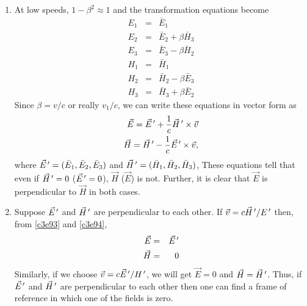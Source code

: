 \begin{enumerate}
\item At low speeds, $1 - \beta^2 \approx 1$ and the transformation equations
become
\begin{eqnarray}
E_1 &=& \bar{E}_1 \\ \label{c3e87}
E_2 &=& \bar{E}_2 + \beta\bar{H}_3 \\ \label{c3e88}
E_3 &=& \bar{E}_3 - \beta\bar{H}_2 \\ \label{c3e89}
H_1 &=& \bar{H}_1 \\ \label{c3e90}
H_2 &=& \bar{H}_2 - \beta\bar{E}_3 \\ \label{c3e92}
H_3 &=& \bar{H}_3 + \beta\bar{E}_2 \label{c3e93}
\end{eqnarray}
Since $\beta = v/c$ or really $v_1/c$, we can write these equations in vector form as
\begin{eqnarray}
\vec{E} = \vec{E}^{\,\prime} + \frac{1}{c}\vec{H}^{\,\prime} \times \vec{v} \label{c3e94} \\
\vec{H} = \vec{H}^{\,\prime} - \frac{1}{c}\vec{E}^{\,\prime} \times \vec{v}, \label{c3e95}
\end{eqnarray}
where $\vec{E}^{\,\prime} = (\bar{E}_1, \bar{E}_2, \bar{E}_3)$ and $\vec{H}^{\,\prime} = 
(\bar{H}_1, \bar{H}_2, \bar{H}_3)$, These equations tell that even if $\vec{H}^{\,\prime}
= 0$ ($\vec{E}^{\,\prime} = 0$), $\vec{H}$ ($\vec{E}$) is not. Further, it is clear that
$\vec{E}$ is perpendicular to $\vec{H}$ in both cases.

\item Suppose $\vec{E}^{\,\prime}$ and $\vec{H}^{\,\prime}$ are perpendicular to each other.
If $\vec{v} = c\vec{H}^{\,\prime}/E^{\,\prime}$ then, from \eqref{c3e93} and \eqref{c3e94},
\begin{eqnarray}
\vec{E} &=& \vec{E}^{\,\prime} \label{c3e96} \\
\vec{H} &=& 0 \label{c3e97}
\end{eqnarray}
Similarly, if we choose $\vec{v} = c\vec{E}^{\,\prime}/H^{\,\prime}$, we will get $\vec{E} = 0$
and $\vec{H} = \vec{H}^{\,\prime}$. Thus, if $\vec{E}^{\,\prime}$ and $\vec{H}^{\,\prime}$ are 
perpendicular to each other then one can find a frame of reference in which one
of the fields is zero.


\end{enumerate}
